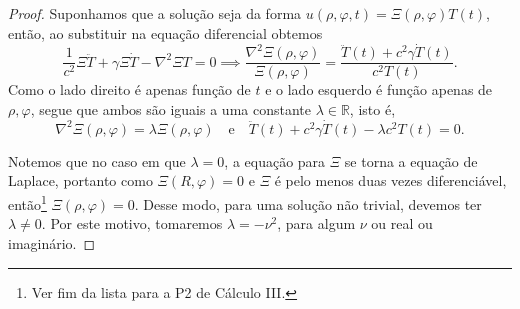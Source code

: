 \begin{proof}
    Suponhamos que a solução seja da forma \(u(\rho, \varphi, t) = \Xi(\rho, \varphi) T(t)\), então, ao substituir na equação diferencial obtemos
    \begin{equation*}
        \frac{1}{c^2}\Xi \ddot{T} + \gamma \Xi \dot{T} - \nabla^2\Xi T = 0 \implies \frac{\nabla^2\Xi(\rho, \varphi)}{\Xi(\rho, \varphi)} = \frac{\ddot{T}(t) + c^2 \gamma \dot{T}(t)}{c^2 T(t)}.
    \end{equation*}
    Como o lado direito é apenas função de \(t\) e o lado esquerdo é função apenas de \(\rho, \varphi\), segue que ambos são iguais a uma constante \(\lambda \in \mathbb{R}\), isto é,
    \begin{equation*}
        \nabla^2 \Xi(\rho, \varphi) = \lambda \Xi(\rho, \varphi)\quad\text{e}\quad \ddot{T}(t) + c^2 \gamma \dot{T}(t) - \lambda c^2 T(t) = 0.
    \end{equation*}

    Notemos que no caso em que \(\lambda = 0\), a equação para \(\Xi\) se torna a equação de Laplace, portanto como \(\Xi(R, \varphi) = 0\) e \(\Xi\) é pelo menos duas vezes diferenciável, então\footnote{Ver fim da lista para a P2 de Cálculo III.} \(\Xi(\rho, \varphi) = 0\). Desse modo, para uma solução não trivial, devemos ter \(\lambda \neq 0\). Por este motivo, tomaremos \(\lambda = - \nu^2\), para algum \(\nu\) ou real ou imaginário.


\end{proof}
